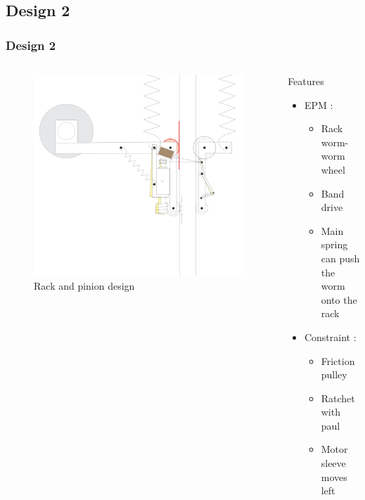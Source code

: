 \subsection*{Design 2}
\begin{frame}
\frametitle{Design 2}
\begin{columns}

\begin{figure}
\centering
\includegraphics[width=\textwidth]{fig/seth_design.pdf}
\caption{Rack and pinion design}
\end{figure}

\begin{block}{Features}
\begin{itemize}
\item
{\greencol EPM :}\\[0.1in]
    \begin{itemize}
    \item
    Rack worm-worm wheel\\[0.1in]
    \item
    Band drive\\[0.1in]
    \item
    Main spring can push the worm onto the rack\\[0.1in]
    \end{itemize}
\item
{\greencol Constraint :}\\[0.1in]
    \begin{itemize}
    \item
    Friction pulley\\[0.1in]
    \item
    Ratchet with paul\\[0.1in]
    \item
    Motor sleeve moves left\\[0.1in]
    \end{itemize}
\end{itemize}
\end{block}


\end{columns}
\end{frame}
